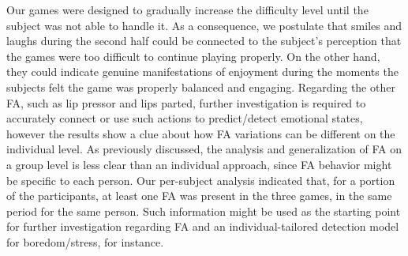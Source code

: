 Our games were designed to gradually increase the difficulty level until the subject was not able to handle it. As a consequence, we postulate that smiles and laughs during the second half could be connected to the subject's perception that the games were too difficult to continue playing properly. On the other hand, they could indicate genuine manifestations of enjoyment during the moments the subjects felt the game was properly balanced and engaging. Regarding the other FA, such as lip pressor and lips parted, further investigation is required to accurately connect or use such actions to predict/detect emotional states, however the results show a clue about how FA variations can be different on the individual level. As previously discussed, the analysis and generalization of FA on a group level is less clear than an individual approach, since FA behavior might be specific to each person. Our per-subject analysis indicated that, for a portion of the participants, at least one FA was present in the three games, in the same period for the same person. Such information might be used as the starting point for further investigation regarding FA and an individual-tailored detection model for boredom/stress, for instance.



